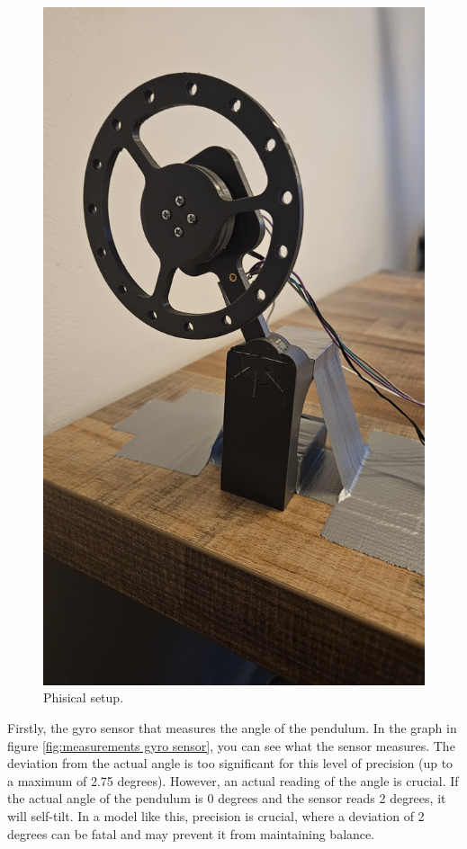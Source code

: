 \documentclass{article}
\begin{document}
\begin{multicols}{2}
\begin{figure}[H]
\centering
\includegraphics[scale=0.040, angle =-90 ]{20240114_155939}
\caption{Phisical setup.}
\label{fig:Phisical setup}
\end{figure}

Firstly, the gyro sensor that measures the angle of the pendulum. In the graph in figure \ref{fig:measurements gyro sensor}, you can see what the sensor measures. The deviation from the actual angle is too significant for this level of precision (up to a maximum of 2.75 degrees). However, an actual reading of the angle is crucial. If the actual angle of the pendulum is 0 degrees and the sensor reads 2 degrees, it will self-tilt. In a model like this, precision is crucial, where a deviation of 2 degrees can be fatal and may prevent it from maintaining balance.


\end{multicols}
\end{document}
